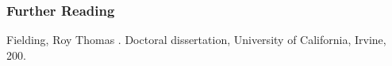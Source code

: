 \begin{frame}[allowframebreaks]
  \frametitle<presentation>{Further Reading}    
  \begin{thebibliography}{10}    
  \beamertemplatebookbibitems
    Fielding, Roy Thomas 
    .
	\newblock Doctoral dissertation, University of California, Irvine, 200.
  \end{thebibliography}
\end{frame}